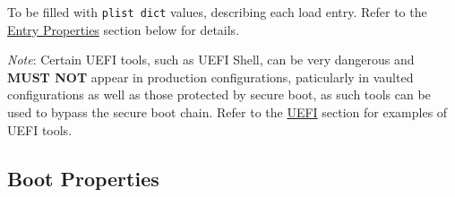 \documentclass[]{article}
\begin{document}
\begin{enumerate}
  To be filled with \texttt{plist\ dict} values, describing each load entry.
  Refer to the \hyperref[miscentryprops]{Entry Properties} section below for details.

  \emph{Note}: Certain UEFI tools, such as UEFI Shell, can be very dangerous and
  \textbf{MUST NOT} appear in production configurations, paticularly in vaulted
  configurations as well as those protected by secure boot, as such tools can be
  used to bypass the secure boot chain.
  Refer to the \hyperref[uefitools]{UEFI} section for examples of UEFI tools.

\end{enumerate}

\subsection{Boot Properties}\label{miscbootprops}
\end{document}
